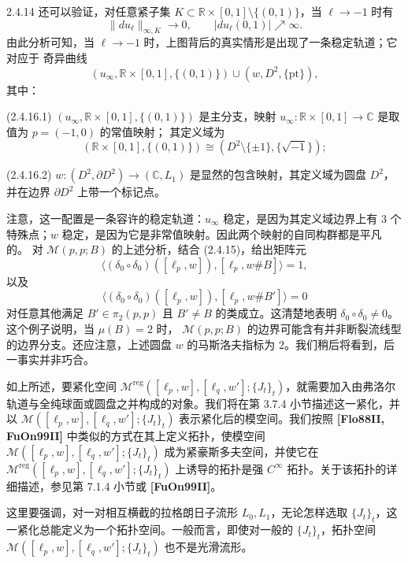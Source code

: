 \begin{example}{2.4.14}
还可以验证，对任意紧子集
$K\subset\mathbb R\times[0,1]\setminus\{(0,1)\}$，当 $\ell\to-1$ 时有
\[
  \lVert du_\ell\rVert_{\infty,K}\longrightarrow0,
  \qquad
  |du_\ell(0,1)|\nearrow\infty.
\]
由此分析可知，当 $\ell\to-1$ 时，上图背后的真实情形是出现了一条稳定轨道；它对应于
奇异曲线
\[
  (u_\infty,\mathbb R\times[0,1],\{(0,1)\})
  \cup(w,D^2,\{\mathrm{pt}\}),
\]
其中：

\par\smallskip\noindent\textup{(2.4.16.1)}\quad
$(u_\infty,\mathbb R\times[0,1],\{(0,1)\})$ 是主分支，映射
$u_\infty:\mathbb R\times[0,1]\to\mathbb C$ 是取值为 $p=(-1,0)$ 的常值映射；
其定义域为
\[
  (\mathbb R\times[0,1],\{(0,1)\})
  \cong(D^2\setminus\{\pm1\},\{\sqrt{-1}\});
\]

\par\smallskip\noindent\textup{(2.4.16.2)}\quad
$w:(D^2,\partial D^2)\to(\mathbb C,L_1)$ 是显然的包含映射，其定义域为圆盘
$D^2$，并在边界 $\partial D^2$ 上带一个标记点。

注意，这一配置是一条容许的稳定轨道：$u_\infty$ 稳定，是因为其定义域边界上有
$3$ 个特殊点；$w$ 稳定，是因为它是非常值映射。因此两个映射的自同构群都是平凡的。
对 $\mathcal M(p,p;B)$ 的上述分析，结合 (2.4.15)，给出矩阵元
\[
  \bigl\langle
    (\delta_0\circ\delta_0)([\ell_p,w]),[\ell_p,w\#B]
  \bigr\rangle=1,
\]
以及
\[
  \bigl\langle
    (\delta_0\circ\delta_0)([\ell_p,w]),[\ell_p,w\#B']
  \bigr\rangle=0
\]
对任意其他满足 $B'\in\pi_2(p,p)$ 且 $B'\neq B$ 的类成立。这清楚地表明
$\delta_0\circ\delta_0\neq0$。这个例子说明，当 $\mu(B)=2$ 时，
$\mathcal M(p,p;B)$ 的边界可能含有并非断裂流线型的边界分支。还应注意，上述圆盘
$w$ 的马斯洛夫指标为 $2$。我们稍后将看到，后一事实并非巧合。
\end{example}

如上所述，要紧化空间
$\mathcal M^{\mathrm{reg}}([\ell_p,w],[\ell_q,w'];\{J_t\}_t)$，就需要加入由弗洛尔
轨道与全纯球面或圆盘之并构成的对象。我们将在第 3.7.4 小节描述这一紧化，并以
$\mathcal M([\ell_p,w],[\ell_q,w'];\{J_t\}_t)$ 表示紧化后的模空间。我们按照
\textbf{[Flo88II, FuOn99II]} 中类似的方式在其上定义拓扑，使模空间
$\mathcal M([\ell_p,w],[\ell_q,w'];\{J_t\}_t)$ 成为紧豪斯多夫空间，并使它在
$\mathcal M^{\mathrm{reg}}([\ell_p,w],[\ell_q,w'];\{J_t\}_t)$ 上诱导的拓扑是强
$C^\infty$ 拓扑。关于该拓扑的详细描述，参见第 7.1.4 小节或
\textbf{[FuOn99II]}。

这里要强调，对一对相互横截的拉格朗日子流形 $L_0,L_1$，无论怎样选取
$\{J_t\}_t$，这一紧化总能定义为一个拓扑空间。一般而言，即使对一般的
$\{J_t\}_t$，拓扑空间
$\mathcal M([\ell_p,w],[\ell_q,w'];\{J_t\}_t)$ 也不是光滑流形。

